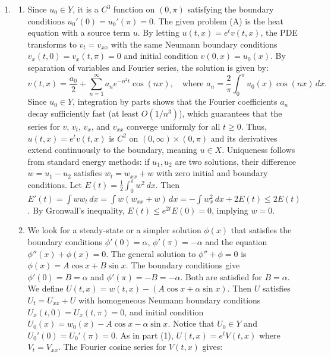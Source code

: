\documentclass{article}
\begin{document}
\begin{enumerate}[label=\fbox{\arabic*}]
  \item %
        \begin{enumerate}[label=(\arabic*)]
          \item Since $u_0 \in Y$, it is a $C^3$ function on $(0, \pi)$ satisfying the boundary conditions $u_0'(0) = u_0'(\pi) = 0$.
                The given problem (A) is the heat equation with a source term $u$. By letting $u(t, x) = e^t v(t, x)$, the PDE transforms to $v_t = v_{xx}$ with the same Neumann boundary conditions $v_x(t, 0) = v_x(t, \pi) = 0$ and initial condition $v(0, x) = u_0(x)$.
                By separation of variables and Fourier series, the solution is given by:
                \[
                  v(t, x) = \frac{a_0}{2} + \sum_{n=1}^\infty a_n e^{-n^2 t} \cos(nx), \quad \text{where } a_n = \frac{2}{\pi} \int_0^\pi u_0(x) \cos(nx) \, dx.
                \]
                Since $u_0 \in Y$, integration by parts shows that the Fourier coefficients $a_n$ decay sufficiently fast (at least $O(1/n^3)$), which guarantees that the series for $v$, $v_t$, $v_x$, and $v_{xx}$ converge uniformly for all $t \ge 0$.
                Thus, $u(t, x) = e^t v(t, x)$ is $C^2$ on $(0, \infty) \times (0, \pi)$ and its derivatives extend continuously to the boundary, meaning $u \in X$.
                Uniqueness follows from standard energy methods: if $u_1, u_2$ are two solutions, their difference $w = u_1 - u_2$ satisfies $w_t = w_{xx} + w$ with zero initial and boundary conditions. Let $E(t) = \frac{1}{2} \int_0^\pi w^2 \, dx$. Then $E'(t) = \int w w_t \, dx = \int w(w_{xx} + w) \, dx = - \int w_x^2 \, dx + 2E(t) \le 2E(t)$. By Gronwall's inequality, $E(t) \le e^{2t} E(0) = 0$, implying $w = 0$.
          \item We look for a steady-state or a simpler solution $\phi(x)$ that satisfies the boundary conditions $\phi'(0) = \alpha$, $\phi'(\pi) = -\alpha$ and the equation $\phi''(x) + \phi(x) = 0$.
                The general solution to $\phi'' + \phi = 0$ is $\phi(x) = A \cos x + B \sin x$.
                The boundary conditions give $\phi'(0) = B = \alpha$ and $\phi'(\pi) = -B = -\alpha$. Both are satisfied for $B = \alpha$.
                We define $U(t, x) = w(t, x) - (A \cos x + \alpha \sin x)$. Then $U$ satisfies $U_t = U_{xx} + U$ with homogeneous Neumann boundary conditions $U_x(t, 0) = U_x(t, \pi) = 0$, and initial condition $U_0(x) = w_0(x) - A \cos x - \alpha \sin x$.
                Notice that $U_0 \in Y$ and $U_0'(0) = U_0'(\pi) = 0$. As in part (1), $U(t, x) = e^t V(t, x)$ where $V_t = V_{xx}$.
                The Fourier cosine series for $V(t, x)$ gives:

\end{enumerate}
\end{enumerate}
\end{document}
